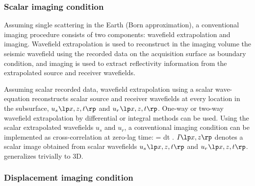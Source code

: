 \subsubsection{Scalar imaging condition}
Assuming single scattering in the Earth (Born approximation), a conventional imaging procedure consists of two components: wavefield extrapolation and imaging. Wavefield extrapolation is used to reconstruct in the imaging volume the seismic wavefield using the recorded data on the acquisition surface as boundary condition, and imaging is used to extract reflectivity information from the extrapolated source and receiver wavefields.

Assuming scalar recorded data, wavefield extrapolation using a scalar wave-equation reconstructs scalar source and receiver wavefields at every location in the subsurface, $\US{}$ and $\UR{}$. One-way or two-way wavefield extrapolation by differential or integral methods can be used. Using the scalar extrapolated wavefields $u_s$ and $u_r$, a conventional imaging condition \cite[]{Claerbout.iei} can be implemented as cross-correlation at zero-lag time: 
\beq \label{eqn:CIC}
\IM{} = \int \US{} \UR{} dt \;.
\eeq
$\IM{}$ denotes a scalar image obtained from scalar wavefields $\US{}$ and $\UR{}$.  generalizes trivially to 3D.
\subsubsection{Displacement imaging condition}

